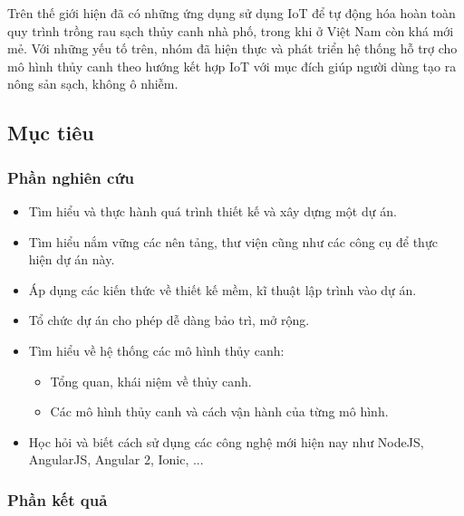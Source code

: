\documentclass[a4paper,12pt,oneside]{article}
\begin{document}
\noindent Trên thế giới hiện đã có những ứng dụng sử dụng IoT để tự động hóa hoàn toàn quy trình trồng rau sạch thủy canh nhà phố, trong khi ở Việt Nam còn khá mới mẻ. Với những yếu tố trên, nhóm đã hiện thực và phát triển hệ thống hỗ trợ cho mô hình thủy canh theo hướng kết hợp IoT với mục đích giúp người dùng tạo ra nông sản sạch, không ô nhiễm.


\subsection{Mục tiêu}
\subsubsection{Phần nghiên cứu}
\begin{itemize}
\item Tìm hiểu và thực hành quá trình thiết kế và xây dựng một dự án.
\item Tìm hiểu nắm vững các nên tảng, thư viện cũng như các công cụ để thực hiện dự án này.
\item Áp dụng các kiến thức về thiết kế mềm, kĩ thuật lập trình vào dự án.
\item Tổ chức dự án cho phép dễ dàng bảo trì, mở rộng.
\item Tìm hiểu về hệ thống các mô hình thủy canh: 
	\begin{itemize}
	\item Tổng quan, khái niệm về thủy canh.
	\item Các mô hình thủy canh và cách vận hành của từng mô hình.
	\end{itemize}
\item Học hỏi và biết cách sử dụng các công nghệ mới hiện nay như NodeJS, AngularJS, Angular 2, Ionic, ...
\end{itemize}

\subsubsection{Phần kết quả}
\end{document}
